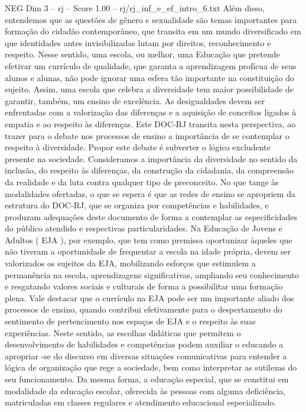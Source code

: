 \begin{textsample}{NEG Dim 3 – rj – Score 1.00 – rj/rj\_inf\_e\_ef\_intro\_6.txt}
Além disso, entendemos que as questões de gênero e sexualidade são temas importantes para formação do cidadão contemporâneo, que transita em um mundo diversificado em que identidades antes invisibilizadas lutam por direitos, reconhecimento e respeito.
Nesse sentido, uma escola, ou melhor, uma Educação que pretende efetivar um currículo de qualidade, que garanta a aprendizagem profícua de seus alunos e alunas, não pode ignorar uma esfera tão importante na constituição do sujeito.
Assim, uma escola que celebra a diversidade tem maior possibilidade de garantir, também, um ensino de excelência.
As desigualdades devem ser enfrentadas com a valorização das diferenças e a aquisição de conceitos ligados à empatia e ao respeito às diferenças.
Este DOC-RJ transita nesta perspectiva, ao trazer para o debate nos processos de ensino a importância de se contemplar o respeito à diversidade.
Propor este debate é subverter o lógico excludente presente na sociedade.
Consideramos a importância da diversidade no sentido da inclusão, do respeito às diferenças, da construção da cidadania, da compreensão da realidade e da luta contra qualquer tipo de preconceito.
No que tange às modalidades ofertadas, o que se espera é que as redes de ensino se apropriem da estrutura do DOC-RJ, que se organiza por competências e habilidades, e produzam adequações deste documento de forma a contemplar as especificidades do público atendido e respectivas particularidades.
Na Educação de Jovens e Adultos ( EJA ), por exemplo, que tem como premissa oportunizar àqueles que não tiveram a oportunidade de frequentar a escola na idade própria, devem ser valorizados os sujeitos da EJA, mobilizando esforços que estimulem a permanência na escola, aprendizagens significativas, ampliando seu conhecimento e resgatando valores sociais e culturais de forma a possibilitar uma formação plena.
Vale destacar que o currículo na EJA pode ser um importante aliado dos processos de ensino, quando contribui efetivamente para o despertamento do sentimento de pertencimento nos espaços de EJA e o respeito às suas experiências.
Neste sentido, as escolhas didáticas que permitem o desenvolvimento de habilidades e competências podem auxiliar o educando a apropriar -se do discurso em diversas situações comunicativas para entender a lógica de organização que rege a sociedade, bem como interpretar as sutilezas do seu funcionamento.
Da mesma forma, a educação especial, que se constitui em modalidade da educação escolar, oferecida às pessoas com alguma deficiência, matriculadas em classes regulares e atendimento educacional especializado.

\end{textsample}
